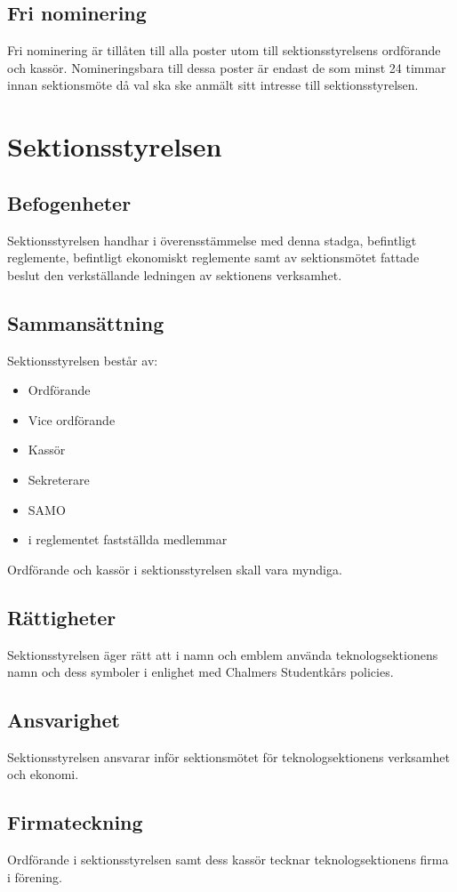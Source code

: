 \documentclass[a4paper]{dtek}
\begin{document}
\subsection{Fri nominering}
Fri nominering är tillåten till alla poster utom till sektionsstyrelsens ordförande och kassör. Nomineringsbara till dessa poster är endast de som minst 24 timmar innan sektionsmöte då val ska ske anmält sitt intresse till sektionsstyrelsen.
\newpage

\section{Sektionsstyrelsen}
\subsection{Befogenheter}
Sektionsstyrelsen handhar i överensstämmelse med denna stadga, befintligt reglemente, befintligt ekonomiskt reglemente samt av sektionsmötet fattade beslut den verkställande ledningen av sektionens verksamhet.
\subsection{Sammansättning}
Sektionsstyrelsen består av:
\begin{itemize}
\item Ordförande
\item Vice ordförande
\item Kassör
\item Sekreterare
\item SAMO
\item i reglementet fastställda medlemmar
\end{itemize}
Ordförande och kassör i sektionsstyrelsen skall vara myndiga.
\subsection{Rättigheter}
Sektionsstyrelsen äger rätt att i namn och emblem använda teknologsektionens namn och dess symboler i enlighet med Chalmers Studentkårs policies.
\subsection{Ansvarighet}
Sektionsstyrelsen ansvarar inför sektionsmötet för teknologsektionens verksamhet och ekonomi.
\subsection{Firmateckning}
Ordförande i sektionsstyrelsen samt dess kassör tecknar teknologsektionens firma i förening. %
\end{document}

